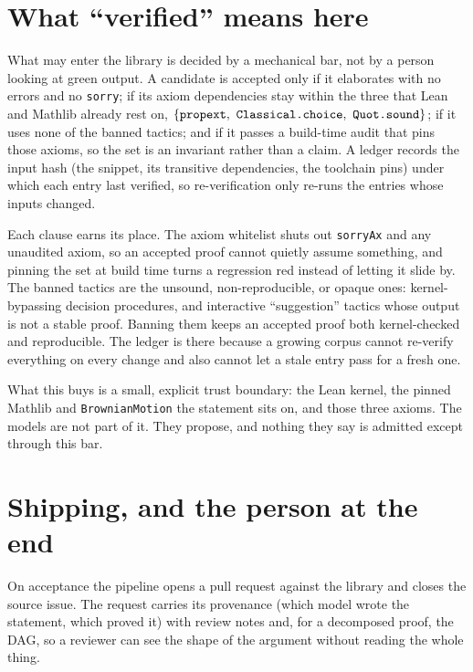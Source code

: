 \documentclass[11pt]{article}
\newcommand{\lean}[1]{\texttt{\def\_{\textunderscore\allowbreak}#1}}
\begin{document}
\section{What ``verified'' means here}\label{sec:accept}

What may enter the library is decided by a mechanical bar, not by a person looking at
green output. A candidate is accepted only if it elaborates with no errors and no
\lean{sorry}; if its axiom dependencies stay within the three that Lean and Mathlib
already rest on, $\{\lean{propext},\ \lean{Classical.choice},\ \lean{Quot.sound}\}$; if it
uses none of the banned tactics; and if it passes a build-time audit that pins those
axioms, so the set is an invariant rather than a claim. A ledger records the input hash
(the snippet, its transitive dependencies, the toolchain pins) under which each entry last
verified, so re-verification only re-runs the entries whose inputs changed.

Each clause earns its place. The axiom whitelist shuts out \lean{sorryAx} and any
unaudited axiom, so an accepted proof cannot quietly assume something, and pinning the set
at build time turns a regression red instead of letting it slide by. The banned tactics
are the unsound, non-reproducible, or opaque ones: kernel-bypassing decision procedures,
and interactive ``suggestion'' tactics whose output is not a stable proof. Banning them
keeps an accepted proof both kernel-checked and reproducible. The ledger is there because
a growing corpus cannot re-verify everything on every change and also cannot let a stale
entry pass for a fresh one.

What this buys is a small, explicit trust boundary: the Lean kernel, the pinned Mathlib
and \lean{BrownianMotion} the statement sits on, and those three axioms. The models are
not part of it. They propose, and nothing they say is admitted except through this bar.

\section{Shipping, and the person at the end}\label{sec:ship}

On acceptance the pipeline opens a pull request against the library and closes the source
issue. The request carries its provenance (which model wrote the statement, which proved
it) with review notes and, for a decomposed proof, the DAG, so a reviewer can see the
shape of the argument without reading the whole thing.
\end{document}
